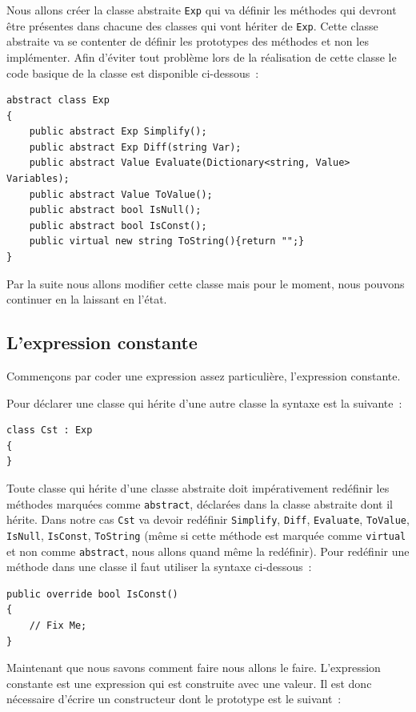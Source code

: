 \documentclass[12pt,a4paper]{report}
\begin{document}
Nous allons créer la classe abstraite \texttt{Exp} qui va définir les
méthodes qui devront être présentes dans chacune des classes qui vont
hériter de \texttt{Exp}. Cette classe abstraite va se contenter de
définir les prototypes des méthodes et non les implémenter. Afin
d'éviter tout problème lors de la réalisation de cette classe le code
basique de la classe est disponible ci-dessous~:

\begin{lstlisting}
abstract class Exp
{
	public abstract Exp Simplify();
	public abstract Exp Diff(string Var);
	public abstract Value Evaluate(Dictionary<string, Value> Variables);
	public abstract Value ToValue();
	public abstract bool IsNull();
	public abstract bool IsConst();
	public virtual new string ToString(){return "";}
}
\end{lstlisting}

Par la suite nous allons modifier cette classe mais pour le moment,
nous pouvons continuer en la laissant en l'état.

\subsection{L'expression constante}

Commençons par coder une expression assez particulière, l'expression constante.

Pour déclarer une classe qui hérite d'une autre classe la syntaxe est la suivante~:

\begin{lstlisting}
class Cst : Exp
{
}
\end{lstlisting}

Toute classe qui hérite d'une classe abstraite doit impérativement
redéfinir les méthodes marquées comme \texttt{abstract}, déclarées
dans la classe abstraite dont il hérite. Dans notre cas \texttt{Cst}
va devoir redéfinir \texttt{Simplify}, \texttt{Diff},
\texttt{Evaluate}, \texttt{ToValue}, \texttt{IsNull},
\texttt{IsConst}, \texttt{ToString} (même si cette méthode est marquée
comme \texttt{virtual} et non comme \texttt{abstract}, nous allons
quand même la redéfinir). Pour redéfinir une méthode dans une classe
il faut utiliser la syntaxe ci-dessous~:

\begin{lstlisting}
public override bool IsConst()
{
	// Fix Me;
}
\end{lstlisting}

Maintenant que nous savons comment faire nous allons le
faire. L'expression constante est une expression qui est construite
avec une valeur. Il est donc nécessaire d'écrire un constructeur dont
le prototype est le suivant~:
\end{document}
